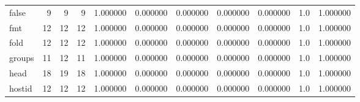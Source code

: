 \begin{tabular}{lrrrrrrrrrr}
false     &                                       9 &                  9 &                                 9 &                                   1.000000 &                               0.000000 &                                     0.000000 &                          0.000000 &                                0.000000 &                                1.0 &                                           1.000000 \\
fmt       &                                      12 &                 12 &                                12 &                                   1.000000 &                               0.000000 &                                     0.000000 &                          0.000000 &                                0.000000 &                                1.0 &                                           1.000000 \\
fold      &                                      12 &                 12 &                                12 &                                   1.000000 &                               0.000000 &                                     0.000000 &                          0.000000 &                                0.000000 &                                1.0 &                                           1.000000 \\
groups    &                                      11 &                 12 &                                11 &                                   1.000000 &                               0.000000 &                                     0.000000 &                          0.000000 &                                0.000000 &                                1.0 &                                           1.000000 \\
head      &                                      18 &                 19 &                                18 &                                   1.000000 &                               0.000000 &                                     0.000000 &                          0.000000 &                                0.000000 &                                1.0 &                                           1.000000 \\
hostid    &                                      12 &                 12 &                                12 &                                   1.000000 &                               0.000000 &                                     0.000000 &                          0.000000 &                                0.000000 &                                1.0 &                                           1.000000 \\

\end{tabular}
